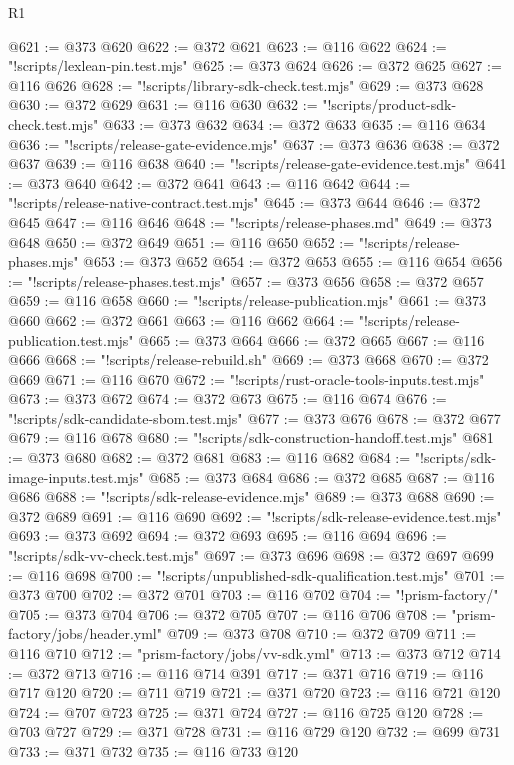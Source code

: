 \begin{lexlean}{R1}
\begin{coremodule}
@621 := @373 @620
@622 := @372 @621
@623 := @116 @622
@624 := "!scripts/lexlean-pin.test.mjs"
@625 := @373 @624
@626 := @372 @625
@627 := @116 @626
@628 := "!scripts/library-sdk-check.test.mjs"
@629 := @373 @628
@630 := @372 @629
@631 := @116 @630
@632 := "!scripts/product-sdk-check.test.mjs"
@633 := @373 @632
@634 := @372 @633
@635 := @116 @634
@636 := "!scripts/release-gate-evidence.mjs"
@637 := @373 @636
@638 := @372 @637
@639 := @116 @638
@640 := "!scripts/release-gate-evidence.test.mjs"
@641 := @373 @640
@642 := @372 @641
@643 := @116 @642
@644 := "!scripts/release-native-contract.test.mjs"
@645 := @373 @644
@646 := @372 @645
@647 := @116 @646
@648 := "!scripts/release-phases.md"
@649 := @373 @648
@650 := @372 @649
@651 := @116 @650
@652 := "!scripts/release-phases.mjs"
@653 := @373 @652
@654 := @372 @653
@655 := @116 @654
@656 := "!scripts/release-phases.test.mjs"
@657 := @373 @656
@658 := @372 @657
@659 := @116 @658
@660 := "!scripts/release-publication.mjs"
@661 := @373 @660
@662 := @372 @661
@663 := @116 @662
@664 := "!scripts/release-publication.test.mjs"
@665 := @373 @664
@666 := @372 @665
@667 := @116 @666
@668 := "!scripts/release-rebuild.sh"
@669 := @373 @668
@670 := @372 @669
@671 := @116 @670
@672 := "!scripts/rust-oracle-tools-inputs.test.mjs"
@673 := @373 @672
@674 := @372 @673
@675 := @116 @674
@676 := "!scripts/sdk-candidate-sbom.test.mjs"
@677 := @373 @676
@678 := @372 @677
@679 := @116 @678
@680 := "!scripts/sdk-construction-handoff.test.mjs"
@681 := @373 @680
@682 := @372 @681
@683 := @116 @682
@684 := "!scripts/sdk-image-inputs.test.mjs"
@685 := @373 @684
@686 := @372 @685
@687 := @116 @686
@688 := "!scripts/sdk-release-evidence.mjs"
@689 := @373 @688
@690 := @372 @689
@691 := @116 @690
@692 := "!scripts/sdk-release-evidence.test.mjs"
@693 := @373 @692
@694 := @372 @693
@695 := @116 @694
@696 := "!scripts/sdk-vv-check.test.mjs"
@697 := @373 @696
@698 := @372 @697
@699 := @116 @698
@700 := "!scripts/unpublished-sdk-qualification.test.mjs"
@701 := @373 @700
@702 := @372 @701
@703 := @116 @702
@704 := "!prism-factory/"
@705 := @373 @704
@706 := @372 @705
@707 := @116 @706
@708 := "prism-factory/jobs/header.yml"
@709 := @373 @708
@710 := @372 @709
@711 := @116 @710
@712 := "prism-factory/jobs/vv-sdk.yml"
@713 := @373 @712
@714 := @372 @713
@716 := @116 @714 @391
@717 := @371 @716
@719 := @116 @717 @120
@720 := @711 @719
@721 := @371 @720
@723 := @116 @721 @120
@724 := @707 @723
@725 := @371 @724
@727 := @116 @725 @120
@728 := @703 @727
@729 := @371 @728
@731 := @116 @729 @120
@732 := @699 @731
@733 := @371 @732
@735 := @116 @733 @120

\end{coremodule}
\end{lexlean}
